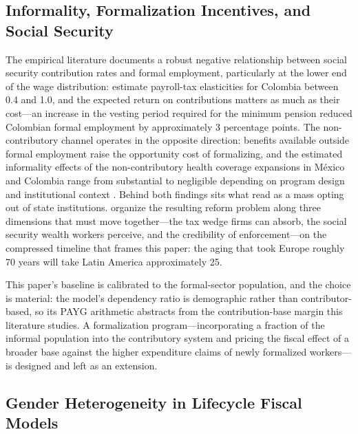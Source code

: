 \documentclass[12pt,a4paper]{article}
\begin{document}
\subsection{Informality, Formalization Incentives, and Social Security}
\label{subsec:lit_informality}

The empirical literature documents a robust negative relationship between social security contribution rates and formal employment, particularly at the lower end of the wage distribution: \citet{Kugler2017} estimate payroll-tax elasticities for Colombia between 0.4 and 1.0, and the expected return on contributions matters as much as their cost---an increase in the vesting period required for the minimum pension reduced Colombian formal employment by approximately 3 percentage points. The non-contributory channel operates in the opposite direction: benefits available outside formal employment raise the opportunity cost of formalizing, and the estimated informality effects of the non-contributory health coverage expansions in M\'exico and Colombia range from substantial to negligible depending on program design and institutional context \citep{BoschCampos2014, AteridoEtAl2011, AzuaraMarinescu2013, CamachoConoverHoyos2013, CalderonMarinescu2012}. Behind both findings sits what \citet{PerryEtAl2007} read as a mass opting out of state institutions. \citet{WorldBankInformalizing2025} organize the resulting reform problem along three dimensions that must move together---the tax wedge firms can absorb, the social security wealth workers perceive, and the credibility of enforcement---on the compressed timeline that frames this paper: the aging that took Europe roughly 70 years will take Latin America approximately 25.

This paper's baseline is calibrated to the formal-sector population, and the choice is material: the model's dependency ratio is demographic rather than contributor-based, so its PAYG arithmetic abstracts from the contribution-base margin this literature studies. A formalization program---incorporating a fraction of the informal population into the contributory system and pricing the fiscal effect of a broader base against the higher expenditure claims of newly formalized workers---is designed and left as an extension.

\subsection{Gender Heterogeneity in Lifecycle Fiscal Models}
\label{subsec:lit_gender}
\end{document}
